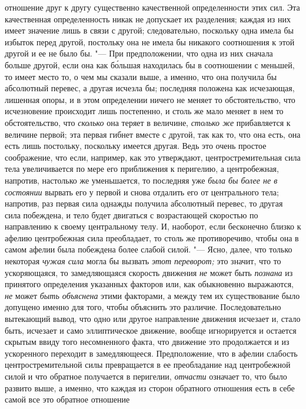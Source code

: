 отношение друг к другу существенно качественной определенности этих сил. Эта
качественная определенность никак не допускает их разделения; каждая из них
имеет значение лишь в связи с другой; следовательно, поскольку одна имела бы
избыток перед другой, постольку она не имела бы никакого соотношения к этой
другой и ее не было бы. "--- При предположении, что одна из них сначала больше
другой, если она как б\'{о}льшая находилась бы в соотношении с меньшей, то
имеет место то, о чем мы сказали выше, а именно, что она получила бы абсолютный
перевес, а другая исчезла бы; последняя положена как исчезающая, лишенная
опоры, и в этом определении ничего не меняет то обстоятельство, что
исчезновение происходит лишь постепенно, и столь же мало меняет в нем то
обстоятельство, что {\em сколько} она теряет в величине, {\em столько же}
прибавляется к величине первой; эта первая гибнет вместе с другой, так как то,
что она есть, она есть лишь постольку, поскольку имеется другая. Ведь это очень
простое соображение, что если, например, как это утверждают,
центростремительная сила тела увеличивается по мере его приближения к
перигелию, а центробежная, напротив, настолько же уменьшается, то последняя уже
{\em была бы более не в состоянии} вырвать его у первой и снова отдалить его от
центрального тела; напротив, раз первая сила однажды получила абсолютный
перевес, то другая сила побеждена, и тело будет двигаться с возрастающей
скоростью по направлению к своему центральному телу. И, наоборот, если
бесконечно близко к афелию центробежная сила преобладает, то столь же
противоречиво, чтобы она в самом афелии была побеждена более слабой силой. "---
Ясно, далее, что только некоторая {\em чужая сила} могла бы вызвать {\em этот
переворот;} это значит, что то ускоряющаяся, то замедляющаяся скорость движения
{\em не} может быть {\em познана} из принятого определения указанных факторов
или, как обыкновенно выражаются, {\em не} может {\em быть объяснена} этими
факторами, а между тем их существование было допущено именно для того, чтобы
объяснить это различие. Последовательно вытекающий вывод, что одно или другое
направление движения исчезает и, стало быть, исчезает и само эллиптическое
движение, вообще игнорируется и остается скрытым ввиду того несомненного факта,
что движение это продолжается и из ускоренного переходит в замедляющееся.
Предположение, что в афелии слабость центростремительной силы превращается в ее
преобладание над центробежной силой и что обратное получается в перигелии,
{\em отчасти} означает то, что было развито выше, а именно, что каждая из
сторон обратного отношения есть в себе самой все это обратное отношение
